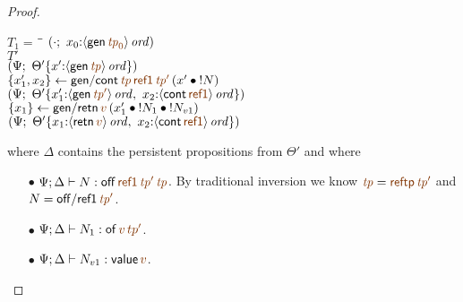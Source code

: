 \begin{proof}
\begin{description}
\begin{tabbing}
$T_1 = ~$ \= \qquad \= 
    $(\cdot; ~ x_0{:}\istrue{\susp{{\sf gen}\,\lf{{\it tp}_0}}})$
\\
\>$T'$
\\
\>\>$(\Psi; ~ \tackon{\Theta'}
      {x'{:}\istrue{\susp{{\sf gen}\,\lf{{\it tp}}}}})$
\\
\>$\trstep{x_1', x_2}
     {{\sf gen/cont}\,\lf{{\it tp}}\,\lf{\sf ref1}\,\lf{{\it tp}'}\,
         (\tfuser{x'}{\tbangr{N}})}$
\\ %
\>\>$(\Psi; ~ \tackon{\Theta'}
     {x_1'{:}\istrue{\susp{{\sf gen}\,\lf{{\it tp}'}}}, ~
      x_2{:}\istrue{\susp{{\sf cont}\,\lf{\sf ref1}}}})$
\\
\>$\trstep{x_1}
     {{\sf gen/retn}\,\lf{v}\,(\tfuser{x_1'}{\tfuser{\tbangr{N_1}}{\tbangr{N_{v1}}}})}$
\\
\>\>$(\Psi; ~ \tackon{\Theta'}{x_1{:}\istrue{\susp{{\sf retn}\,\lf{v}}}, ~
                   x_2{:}\istrue{\susp{{\sf cont}\,\lf{\sf ref1}}}})$
\end{tabbing}
where $\Delta$ contains the persistent propositions from $\Theta'$ and where
\begin{itemize}
\item[$\bullet$] $\Psi; \Delta \vdash N : {\sf off}\,\lf{\sf ref1}\,\lf{{\it tp}'}\,\lf{{\it tp}}$.  By traditional
  inversion we know $\lf{\it{tp}} = \lf{{\sf reftp}\,{\it tp}'}$ and $N = {\sf off/ref1}\,\lf{{\it tp}'}$.
\item[$\bullet$] $\Psi; \Delta \vdash N_1 : {\sf of}\,\lf{v}\,\lf{tp'}$. 
\item[$\bullet$] $\Psi; \Delta \vdash N_{v1} : {\sf value}\,\lf{v}$.
\end{itemize}


\end{description}
\end{proof}
